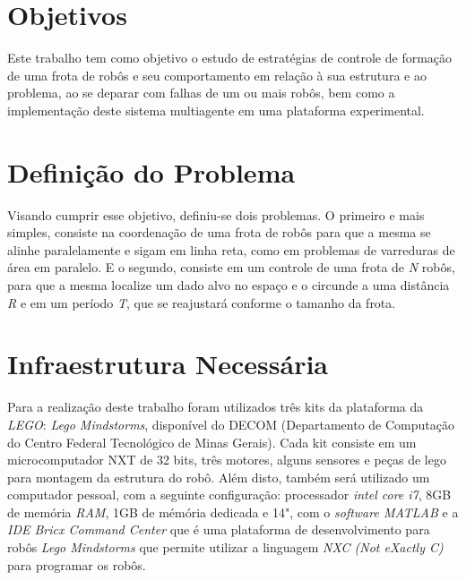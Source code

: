 \section{Objetivos}
\label{sec:objetivos}

Este trabalho tem como objetivo o estudo de estratégias de controle de formação de uma frota de robôs e seu comportamento em relação à sua estrutura e ao problema, ao se deparar com falhas de um ou mais robôs, bem como a implementação deste sistema multiagente em uma plataforma experimental.%

\section{Definição do Problema}
\label{sec:defProb}
Visando cumprir esse objetivo, definiu-se dois problemas. O primeiro e mais simples, consiste na coordenação de uma frota de robôs para que a mesma se alinhe paralelamente e sigam em linha reta, como em problemas de varreduras de área em paralelo. E o segundo, consiste em um controle de uma frota de \emph{N} robôs, para que a mesma localize um dado alvo no espaço e o circunde a uma distância \emph{R} e em um período \emph{T}, que se reajustará conforme o tamanho da frota.  

\section{Infraestrutura Necessária}
\label{sec:infra}


Para a realização deste trabalho foram utilizados três kits da plataforma da \emph{LEGO\textregistered}: \emph{Lego Mindstorms\textregistered}, disponível do DECOM (Departamento de Computação do Centro Federal Tecnológico de Minas Gerais). Cada kit consiste em um microcomputador NXT de 32 bits, três motores, alguns sensores e peças de lego para montagem da estrutura do robô. Além disto, também será utilizado  um computador pessoal, com a seguinte configuração: processador \emph{intel core i7}, 8GB de memória \emph{RAM}, 1GB de mémória dedicada e 14", com o \emph{software MATLAB\textregistered} e a \emph{IDE Bricx Command Center} \cite{sorceforge2001} que é uma plataforma de desenvolvimento para robôs \emph{Lego Mindstorms\textregistered} que permite utilizar a linguagem \emph{NXC (Not eXactly C)} para programar os robôs.
